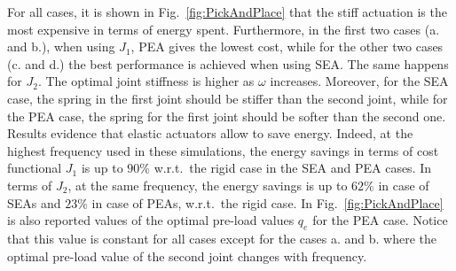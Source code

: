 For all cases, it is shown in Fig.~\ref{fig:PickAndPlace} that the stiff actuation is the most expensive in terms of energy spent. Furthermore, in the first two cases (a. and b.), when using $J_1$, PEA gives the lowest cost, while for the other two cases (c. and d.) the best performance is achieved when using SEA. The same happens for $J_2$. The optimal joint stiffness is higher as $\omega$ increases.
Moreover, for the SEA case, the spring in the first joint should be stiffer than the second joint, while for the PEA case, the spring for the first joint should be softer than the second one. Results evidence that elastic actuators allow to save energy. Indeed, at the highest frequency used in these simulations, the energy savings in terms of cost functional $J_1$ is up to $90\%$ w.r.t.~the rigid case in the SEA and PEA cases. In terms of $J_2$, at the same frequency, the energy savings is up to $62\%$ in case of SEAs and $23\%$ in case of PEAs, w.r.t.~the rigid case. In Fig.~\ref{fig:PickAndPlace} is also reported values of the optimal pre-load values $q_e$ for the PEA case. Notice that this value is constant for all cases except for the cases a. and b. where the optimal pre-load value of the second joint changes with frequency.

